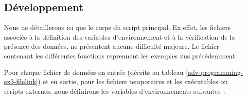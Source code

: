 \subsection{\label{adv-programming-ex3-devl}D{\'e}veloppement}

Nous ne d{\'e}taillerons ici que le corps du script principal. En effet, les
fichiers associ{\'e}s {\`a} la d{\'e}finition des variables d'environnement et {\`a} la
v{\'e}rification de la pr{\'e}sence des donn{\'e}es, ne pr{\'e}sentent aucune difficult{\'e}
majeure. Le fichier contenant les diff{\'e}rentes fonctions reprennent les
exemples vus pr{\'e}c{\'e}demment.

Pour chaque fichier de donn{\'e}es en entr{\'e}e (d{\'e}crits au tableau
\ref{adv-programming-ex3-filelink}) et en sortie, pour les fichiers
temporaires et les ex{\'e}cutables ou scripts externes, nous d{\'e}finirons les
variables d'environnements suivantes~:
